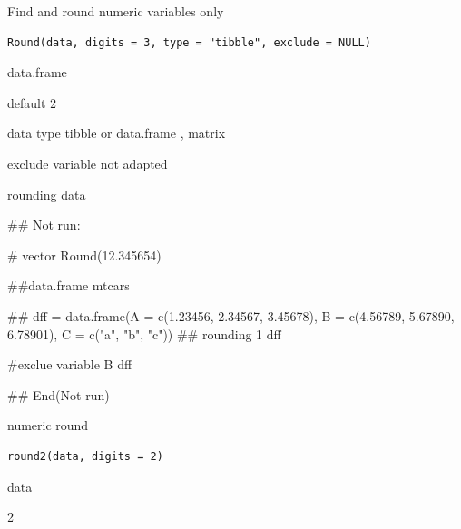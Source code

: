 \documentclass[a4paper]{book}
\begin{document}
%
\begin{Description}
Find and round numeric variables only
\end{Description}
%
\begin{Usage}
\begin{verbatim}
Round(data, digits = 3, type = "tibble", exclude = NULL)
\end{verbatim}
\end{Usage}
%
\begin{Arguments}
\begin{ldescription}
\item[\code{data}] data.frame

\item[\code{digits}] default 2

\item[\code{type}] data type tibble or data.frame , matrix

\item[\code{exclude}] exclude variable not adapted
\end{ldescription}
\end{Arguments}
%
\begin{Value}
rounding data
\end{Value}
%
\begin{Examples}
\begin{ExampleCode}
\#\# Not run: 

# vector
Round(12.345654)

##data.frame
mtcars%

 ##
dff = data.frame(A = c(1.23456, 2.34567, 3.45678),
                 B = c(4.56789, 5.67890, 6.78901),
                C = c("a", "b", "c"))
 ## rounding 1
 dff%

#exclue variable B
 dff%


## End(Not run)
\end{ExampleCode}
\end{Examples}
%
\begin{Description}
numeric round
\end{Description}
%
\begin{Usage}
\begin{verbatim}
round2(data, digits = 2)
\end{verbatim}
\end{Usage}
%
\begin{Arguments}
\begin{ldescription}
\item[\code{data}] data

\item[\code{digits}] 2
\end{ldescription}
\end{Arguments}
\end{document}
